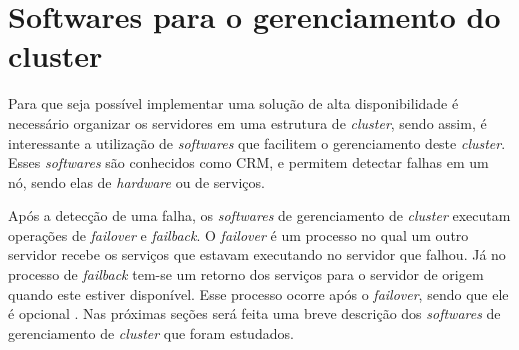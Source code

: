 

\section{Softwares para o gerenciamento do cluster}
\label{section:toolcluster}

Para que seja possível implementar uma solução de alta disponibilidade é necessário organizar os servidores em uma estrutura de \textit{cluster},
sendo assim, é interessante a utilização de \textit{softwares} que facilitem o gerenciamento deste \textit{cluster}. Esses \textit{softwares} 
são conhecidos como \ac{CRM}, e permitem detectar falhas em um nó, sendo elas de \textit{hardware} ou de serviços. 

Após a detecção de uma falha, os \textit{softwares} de gerenciamento de \textit{cluster} executam operações de \textit{failover} e 
\textit{failback}. O \textit{failover} é um processo no qual um outro servidor recebe os serviços que estavam executando no servidor que falhou. 
Já no processo de \textit{failback} tem-se um retorno dos serviços para o servidor de origem quando este estiver disponível. Esse processo ocorre 
após o \textit{failover}, sendo que ele é opcional \cite{bassan2008}. Nas próximas seções será feita uma breve descrição dos \textit{softwares} de 
gerenciamento de \textit{cluster} que foram estudados.


